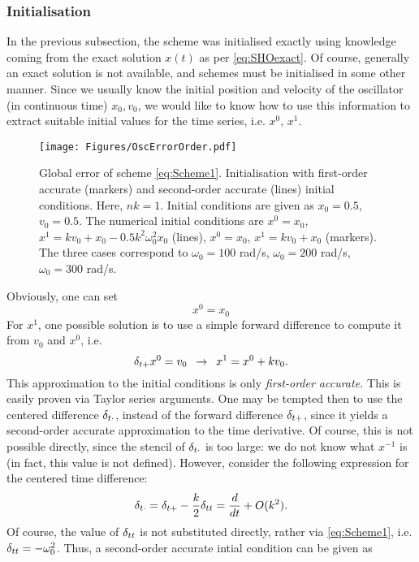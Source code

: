 \subsubsection{Initialisation}\label{sec:Init}
In the previous subsection, the scheme was initialised exactly using knowledge coming from the exact solution $x(t)$ as per \eqref{eq:SHOexact}. Of course, generally an exact solution is not available, and schemes must be initialised in some other manner. Since we usually know the initial position and velocity of the oscillator (in continuous time) $x_0, v_0$, we would like to know how to use this information to extract suitable initial values for the time series, i.e. $x^0$, $x^1$.
\begin{figure}[hbt]
    \centering
    \texttt{[image: Figures/OscErrorOrder.pdf]}
    \caption{Global error of scheme \eqref{eq:Scheme1}. Initialisation with first-order accurate (markers) and second-order accurate (lines) initial conditions. Here, $nk = 1$. Initial conditions are given as $x_0 = 0.5$, $v_0 = 0.5$. The numerical initial conditions are $x^0 = x_0$, $x^1 = kv_0 + x_0 - 0.5 k^2 \omega_0^2 x_0$ (lines), $x^0 = x_0$, $x^1 = kv_0 + x_0$ (markers). The three cases correspond to $\omega_0 = 100$ rad/s, $\omega_0 = 200$ rad/s, $\omega_0 = 300$ rad/s.}\label{fig:SHOerrsOrders}
\end{figure}
Obviously, one can set 
\begin{equation}
    x^0=x_0
\end{equation}
For $x^1$, one possible solution is to use a simple forward difference to compute it from $v_0$ and $x^0$, i.e. 
\begin{equation}
    \delta_{t+} x^0 = v_0 \,\,\, \rightarrow \,\,\, x^1 = x^0 + kv_0.
\end{equation}
This approximation to the initial conditions is only \emph{first-order accurate.} This is easily proven via Taylor series arguments. One may be tempted then to use the centered difference $\delta_{t\cdot}$, instead of the forward difference $\delta_{t+}$, since it yields a second-order accurate approximation to the time derivative. Of course, this is not possible directly, since the stencil of $\delta_{t\cdot}$ is too large: we do not know what $x^{-1}$ is (in fact, this value is not defined). However, consider the following expression for the centered time difference:
\begin{equation}\label{eq:dtdInit}
    \delta_{t\cdot} = \delta_{t+} - \frac{k}{2} \delta_{tt} = \frac{d}{dt} + O(k^2).
\end{equation}
Of course, the value of $\delta_{tt}$ is not substituted directly, rather via \eqref{eq:Scheme1}, i.e. $\delta_{tt} = -\omega_0^2$. Thus, a second-order accurate intial condition can be given as
